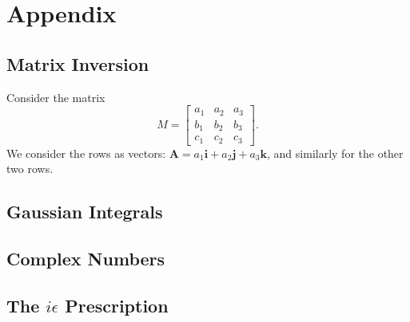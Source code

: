 \section{Appendix}

\subsection{Matrix Inversion}\label{matrix inversion}

Consider the matrix
\begin{equation}
    M = 
    \begin{bmatrix}
    a_1 & a_2 & a_3 \\
    b_1 & b_2 & b_3 \\
    c_1 & c_2 & c_3
    \end{bmatrix}.
\end{equation}
We consider the rows as vectors: $\bm{A} = a_1\bm{i} + a_2\bm{j} + a_3\bm{k}$, and similarly for the other two rows.

\subsection{Gaussian Integrals}

\subsection{Complex Numbers}

\subsection{The $i\epsilon$ Prescription}
